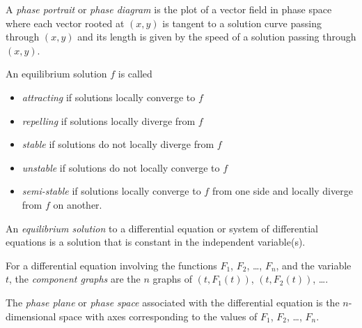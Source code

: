 \begin{SaveDefinition}[key=PhasePortrait, title={Phase Portrait}]
		A \emph{phase portrait} or \emph{phase diagram} is the plot of a vector field in phase space
		where each vector rooted at $(x,y)$ is tangent to a solution curve passing through $(x,y)$
		and its length is given by the speed of a solution passing through $(x,y)$.
\end{SaveDefinition}
\begin{SaveDefinition}[key=ClassificationOfEquilibria, title={Classification of Equilibria}]
		An equilibrium solution \emph{$f$} is called
		\begin{itemize}
			\item \emph{attracting} if solutions locally converge to $f$
			\item \emph{repelling} if solutions locally diverge from $f$
			\item \emph{stable} if solutions do not locally diverge from $f$
			\item \emph{unstable} if solutions do not locally converge to $f$
			\item \emph{semi-stable} if solutions locally converge to $f$ from one side and
			locally diverge from $f$ on another.
		\end{itemize}
\end{SaveDefinition}

\begin{SaveDefinition}[key=EquilibriumSolution, title={Equilibrium Solution}]
	An \emph{equilibrium solution} to a differential equation or system of differential equations is a
	solution that is constant in the independent variable(s).
\end{SaveDefinition}

\begin{SaveDefinition}[key=ComponentGraphAndPhasePlane, title={Component Graph \& Phase Plane}]
	For a differential equation involving the functions $F_1$, $F_2$, \ldots, $F_n$, and the variable $t$,
	the \emph{component graphs} are the $n$ graphs of $(t, F_1(t))$, $(t, F_2(t))$, \ldots.
	
	The \emph{phase plane} or \emph{phase space} associated with the differential equation
	is the $n$-dimensional space with axes corresponding to
	the values of $F_1$, $F_2$, \ldots, $F_n$.
\end{SaveDefinition}



